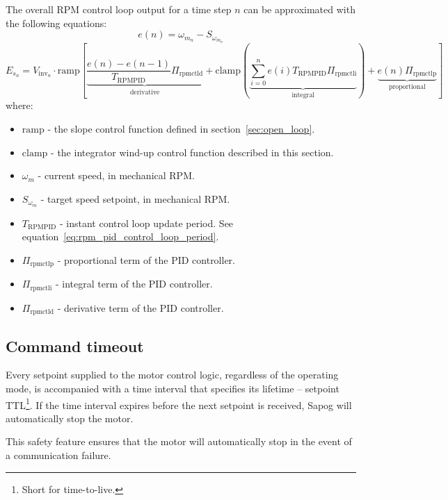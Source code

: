 \documentclass{zubaxdoc}
\begin{document}
	The overall RPM control loop output for a time step $n$ can be approximated with the following equations:
	\begin{equation}
		e(n) = \omega_{m_{n}} - S_{\omega_{m_{n}}}
	\end{equation}
	\begin{equation}
		E_{s_n} = V_{\text{inv}_n}\cdot\mathrm{ramp}
		\left[
		\underbrace{\frac{e\left(n\right) - e\left(n-1\right)}{T_{\text{RPMPID}}} \Pi_{\text{rpmctld}}}_\text{derivative} +
		\mathrm{clamp}\left(
		\underbrace{\sum_{i=0}^n e\left(i\right) T_{\text{RPMPID}} \Pi_{\text{rpmctli}}}_\text{integral}
		\right) +
		\underbrace{e\left(n\right) \Pi_{\text{rpmctlp}}}_\text{proportional}
		\right]
	\end{equation}
	where:
	\begin{itemize}
		\item $\mathrm{ramp}$ - the slope control function defined in section~\ref{sec:open_loop}.
		\item $\mathrm{clamp}$ - the integrator wind-up control function described in this section.
		\item $\omega_{m}$ - current speed, in mechanical RPM.
		\item $S_{\omega_{m}}$ - target speed setpoint, in mechanical RPM.
		\item $T_{\text{RPMPID}}$ - instant control loop update period.
		See equation~\ref{eq:rpm_pid_control_loop_period}.
		\item $\Pi_{\text{rpmctlp}}$ - proportional term of the PID controller.
		\item $\Pi_{\text{rpmctli}}$ - integral term of the PID controller.
		\item $\Pi_{\text{rpmctld}}$ - derivative term of the PID controller.
	\end{itemize}
	
	\subsection{Command timeout}\label{sec:setpoint_ttl}
	
	Every setpoint supplied to the motor control logic, regardless of the operating mode, is
	accompanied with a time interval that specifies its lifetime -- setpoint TTL\footnote{Short for time-to-live.}.
	If the time interval expires before the next setpoint is received, Sapog will automatically
	stop the motor.
	
	This safety feature ensures that the motor will automatically stop in the event of a communication failure.
	
\end{document}

